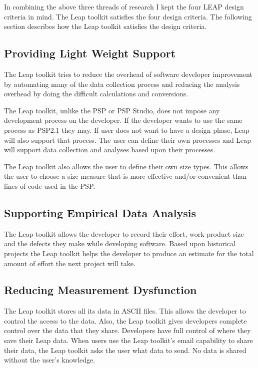 In combining the above three threads of research I kept the four LEAP design
criteria in mind.  The Leap toolkit satisfies the four design criteria.  The
following section describes how the Leap toolkit satisfies the design criteria.

\subsection{Providing Light Weight Support}

The Leap toolkit tries to reduce the overhead of software developer
improvement by automating many of the data collection process and reducing the
analysis overhead by doing the difficult calculations and conversions.

The Leap toolkit, unlike the PSP or PSP Studio, does not impose any development
process on the developer.  If the developer wants to use the same process as
PSP2.1 they may. If user does not want to have a design phase, Leap will also
support that process.  The user can define their own processes and Leap will
support data collection and analyses based upon their processes.

The Leap toolkit also allows the user to define their own size types.  This
allows the user to choose a size measure that is more effective and/or
convenient than lines of code used in the PSP.

\subsection{Supporting Empirical Data Analysis}

The Leap toolkit allows the developer to record their effort, work product size
and the defects they make while developing software.  Based upon historical
projects the Leap toolkit helps the developer to produce an estimate for the
total amount of effort the next project will take. 


\subsection{Reducing Measurement Dysfunction}

The Leap toolkit stores all its data in ASCII files.  This allows the developer
to control the access to the data.  Also, the Leap toolkit gives developers
complete control over the data that they share. Developers have full control of
where they save their Leap data. When users use the Leap toolkit's email
capability to share their data, the Leap toolkit asks the user what data to
send.  No data is shared without the user's knowledge.

